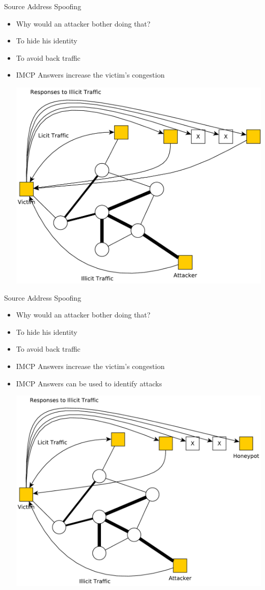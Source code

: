 \documentclass{beamer}
\begin{document}
\begin{frame}{Source Address Spoofing }
  \begin{itemize}
  \item Why would an attacker bother doing that?
  \item To hide his identity
  \item To avoid back traffic
  \item IMCP Answers increase the victim's congestion
  \begin{center}
    \includegraphics[width=0.7\linewidth]{dos3}
  \end{center}
  \end{itemize}
\end{frame}

\begin{frame}{Source Address Spoofing }
  \begin{itemize}
  \item Why would an attacker bother doing that?
  \item To hide his identity
  \item To avoid back traffic
  \item IMCP Answers increase the victim's congestion
  \item IMCP Answers can be used to identify attacks
  \begin{center}
    \includegraphics[width=0.6\linewidth]{dos4}
  \end{center}
  \end{itemize}
\end{frame}
\end{document}
